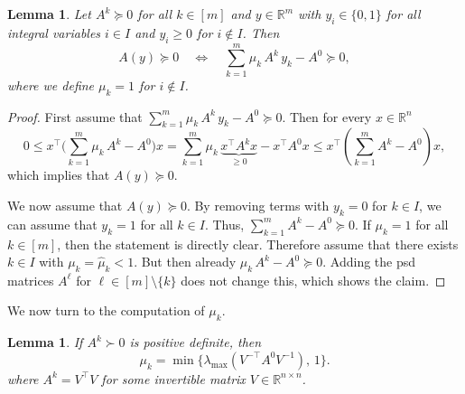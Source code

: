 \documentclass[10pt, a4paper]{article}
\newcommand{\T}{^{\top}}
\newcommand{\R}{\mathds{R}}
\newtheorem{lemma}[theorem]{Lemma}
\begin{document}
\begin{lemma}\label{lem:TightenedProblem}
  Let $A^k \succeq 0$ for all $k \in [m]$ and $y \in \R^m$ with
  $y_i \in \{0,1\}$ for all integral variables $i \in I$ and $y_i \geq 0$
  for $i \notin I$. Then
  \[
    A(y) \succeq 0 \quad\Leftrightarrow\quad
    \sum_{k=1}^m \mu_k\, A^k\, y_k - A^0 \succeq 0,
  \]
  where we define $\mu_k = 1$ for $i \notin I$.
\end{lemma}


\begin{proof}
  First assume that
  $\sum_{k=1}^m \mu_k\, A^k\, y_k - A^0 \succeq 0$. Then for every
  $x \in \R^n$
  \[
    0 \leq x\T \bigg(\sum_{k=1}^m \mu_k\, A^k - A^0\bigg) x =
    \sum_{k=1}^m \mu_k\, \underbrace{x\T A^k x}_{\geq 0} -
    x\T A^0 x \leq x\T (\sum_{k=1}^m A^k - A^0) x,
  \]
  which implies that $A(y) \succeq 0$.

  We now assume that $A(y) \succeq 0$. By removing terms with $y_k = 0$ for
  $k \in I$, we can assume that $y_k = 1 $ for all $k \in I$. Thus,
  $\sum_{k=1}^m A^k - A^0 \succeq 0$. If $\mu_k = 1$ for all $k \in [m]$,
  then the statement is directly clear. Therefore assume that there exists
  $k \in I$ with $\mu_k = \hat{\mu}_k < 1$. But then already
  $\mu_k\, A^k - A^0 \succeq 0$. Adding the psd matrices $A^{\ell}$ for
  $\ell \in [m] \setminus \{k\}$ does not change this, which shows the
  claim.
\end{proof}

We now turn to the computation of $\mu_k$.

\begin{lemma}\label{lem:TightenPosDef}
  If $A^k \succ 0$ is positive definite, then
  \[
    \mu_k = \min \big\{ \lambda_{\max}(V^{-\top} A^0 V^{-1}),\, 1\big\}.
  \]
  where $A^k = V\T V$ for some invertible matrix $V \in \R^{n \times n}$.
\end{lemma}
\end{document}

